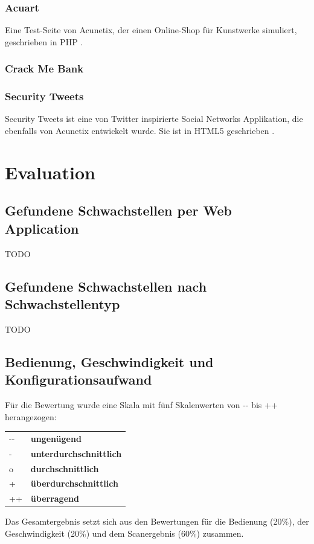 \documentclass[12pt,oneside,a4paper,parskip]{scrbook}
\begin{document}
  \subsection{Acuart}
    Eine Test-Seite von Acunetix, der einen Online-Shop für Kunstwerke simuliert, geschrieben in PHP \cite{Acuart}.
  \subsection{Crack Me Bank} \cite{CrackMeBank}
  \subsection{Security Tweets}
    Security Tweets ist eine von Twitter inspirierte Social Networks Applikation, die ebenfalls von Acunetix entwickelt wurde. Sie ist in HTML5 geschrieben \cite{Tweets}.
\chapter{Evaluation}
  \section{Gefundene Schwachstellen per Web Application}
  TODO
  \section{Gefundene Schwachstellen nach Schwachstellentyp}
  TODO
  \section{Bedienung, Geschwindigkeit und Konfigurationsaufwand}
   Für die Bewertung wurde eine Skala mit fünf Skalenwerten von -{}- bis ++ herangezogen:
   \begin{table}[H]
      \begin{tabular}{ll}
      -{}-         & \textbf{ungenügend}             \\
      -            & \textbf{unterdurchschnittlich}  \\
      o            & \textbf{durchschnittlich}       \\
      +            & \textbf{überdurchschnittlich}   \\
      ++           & \textbf{überragend}
      \end{tabular}
    \end{table}
    Das Gesamtergebnis setzt sich aus den Bewertungen für die Bedienung (20\%), der Geschwindigkeit (20\%) und dem Scanergebnis (60\%) zusammen.
\end{document}
